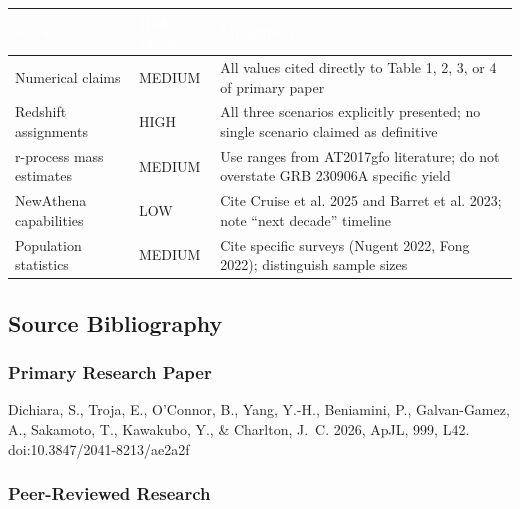 \documentclass[11pt,letterpaper]{article}
\newcommand{\tableheader}[1]{\textbf{\sffamily\textcolor{white}{#1}}}
\begin{document}
\begin{center}
\begin{tabularx}{\textwidth}{L{3.5cm}L{3cm}X}
\toprule
{}
\tableheader{Area} & \tableheader{Risk Level} & \tableheader{Mitigation} \\
\midrule
Numerical claims & MEDIUM & All values cited directly to Table 1, 2, 3, or 4 of primary paper \\
Redshift assignments & HIGH & All three scenarios explicitly presented; no single scenario claimed as definitive \\
r-process mass estimates & MEDIUM & Use ranges from AT2017gfo literature; do not overstate GRB 230906A specific yield \\
NewAthena capabilities & LOW & Cite Cruise et al. 2025 and Barret et al. 2023; note ``next decade'' timeline \\
Population statistics & MEDIUM & Cite specific surveys (Nugent 2022, Fong 2022); distinguish sample sizes \\
\bottomrule
\end{tabularx}
\end{center}

\subsection{Source Bibliography}

\subsubsection{Primary Research Paper}
Dichiara, S., Troja, E., O'Connor, B., Yang, Y.-H., Beniamini, P., Galvan-Gamez, A., Sakamoto, T., Kawakubo, Y., \& Charlton, J.~C. 2026, ApJL, 999, L42. doi:10.3847/2041-8213/ae2a2f

\subsubsection{Peer-Reviewed Research}
\end{document}
